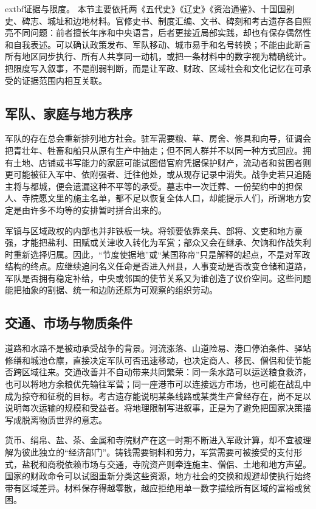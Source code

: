 \noindent	extbf{证据与限度。} 本节主要依托两《五代史》《辽史》《资治通鉴》、十国国别史、碑志、城址和边地材料。官修史书、制度汇编、文书、碑刻和考古遗存各自照亮不同问题：前者擅长年序和中央语言，后者更接近局部实践，却也有保存偶然性和自我表述。可以确认政策发布、军队移动、城市易手和名号转换；不能由此断言所有地区同步执行、所有人共享同一动机，或把一条材料中的数字视为精确统计。把限度写入叙事，不是削弱判断，而是让军政、财政、区域社会和文化记忆在可承受的证据范围内相互关联。

\subsection{军队、家庭与地方秩序}
军队的存在总会重新排列地方社会。驻军需要粮、草、房舍、修具和向导，征调会把青壮年、牲畜和船只从原有生产中抽走；但不同人群并不以同一种方式回应。拥有土地、店铺或书写能力的家庭可能试图借官府凭据保护财产，流动者和贫困者则更可能被征入军中、依附强者、迁往他处，或从现存记录中消失。战争史若只追随主将与都城，便会遗漏这种不平等的承受。墓志中一次迁葬、一份契约中的担保人、寺院愿文里的施主名单，都不足以恢复全体人口，却能提示人们，所谓地方安定是由许多不均等的安排暂时拼合出来的。

军镇与区域政权的内部也并非铁板一块。将领要依靠亲兵、部将、文吏和地方豪强，才能把盐利、田赋或关津收入转化为军赏；部众又会在继承、欠饷和作战失利时重新选择归属。因此，“节度使据地”或“某国称帝”只是解释的起点，不是对军政结构的终点。应继续追问名义任命是否进入州县，人事变动是否改变仓储和道路，军队是否拥有稳定补给，中央或邻国的使节关系又为谁创造了议价空间。这些问题能把抽象的割据、统一和边防还原为可观察的组织劳动。

\subsection{交通、市场与物质条件}
道路和水路不是被动承受战争的背景。河流涨落、山道险易、港口停泊条件、驿站修缮和城池仓廪，直接决定军队可否迅速移动，也决定商人、移民、僧侣和使节能否跨区域往来。交通改善并不自动带来共同繁荣：同一条水路可以运送粮食救济，也可以将地方余粮优先输往军营；同一座港市可以连接远方市场，也可能在战乱中成为掠夺和征税的目标。考古遗存能说明某条线路或某类生产曾经存在，尚不足以说明每次运输的规模和受益者。将地理限制写进叙事，正是为了避免把国家决策描写成脱离物质世界的意志。

货币、绢帛、盐、茶、金属和寺院财产在这一时期不断进入军政计算，却不宜被理解为彼此独立的“经济部门”。铸钱需要铜料和劳力，军赏需要可被接受的支付形式，盐税和商税依赖市场与交通，寺院资产则牵连施主、僧侣、土地和地方声望。国家的财政命令可以试图重新分类这些资源，地方社会的交换和规避却使执行始终带有区域差异。材料保存得越零散，越应拒绝用单一数字描绘所有区域的富裕或贫困。

